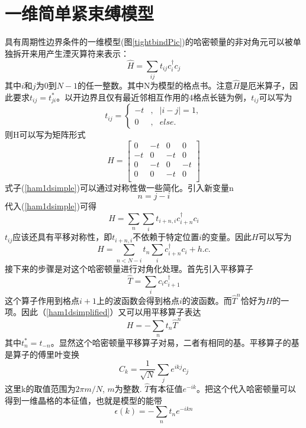 \section{一维简单紧束缚模型}
具有周期性边界条件的一维模型(图\ref{tightbindPic})的哈密顿量的非对角元可以被单独拆开来用产生湮灭算符来表示：
\begin{equation}
  \hat{H} = \sum_{ij} t_{ij} c_{i}^{\dagger} c_j
  \label{ham1dsimple}
\end{equation}
其中$i$和$j$为$0$到$N-1$的任一整数。其中N为模型的格点书。注意$\hat{H}$是厄米算子，因此要求$t_{ij} = t^*_{ji}$。以开边界且仅有最近邻相互作用的4格点长链为例，$t_{ij}$可以写为
\begin{equation}
\label{eq6}
t_{ij}=\left\{
\begin{aligned}
-t & , & |i - j| = 1, \\
0 & , & else.
\end{aligned}
\right.
\end{equation}
则H可以写为矩阵形式
\begin{equation}
H =
\begin{bmatrix} 

    0 & -t & 0 & 0 \\
    -t & 0 & -t & 0 \\
    0 & -t & 0 & -t \\
    0 & 0 & -t & 0 \\
  \end{bmatrix}
 \end{equation}
式子(\ref{ham1dsimple})可以通过对称性做一些简化。引入新变量n
\begin{equation}
  n = j - i
\end{equation}
代入(\ref{ham1dsimple})可得
\begin{equation}
  H = \sum_{n} \sum_i t_{i+n, i} c_{i+n}^\dagger c_i
\end{equation}
$t_{ij}$应该还具有平移对称性，即$t_{i+n, i}$不依赖于特定位置$i$的变量。因此$H$可以写为
\begin{equation}
  H = \sum_{n < N - i} t_n \sum_i c_{i+n}^\dagger c_i + h.c.
  \label{ham1dsimplified}
\end{equation}
接下来的步骤是对这个哈密顿量进行对角化处理。首先引入平移算子
\begin{equation}
  \hat{T} = \sum_i c_i c^\dagger_{i + 1}
\end{equation}
这个算子作用到格点$i + 1$上的波函数会得到格点$i $的波函数。而$\hat{T}^n$恰好为$H$的一项。因此（\ref{ham1dsimplified}）又可以用平移算子表达
\begin{equation}
  H = - \sum_n t_n \hat{T}^n
\end{equation}
其中$t_n^* = t_{-n}$。显然这个哈密顿量平移算子对易，二者有相同的基。平移算子的基是算子的傅里叶变换
\begin{equation}
  C_k = \frac{1}{\sqrt{N}} \sum_j e^{ikj} c_j
\end{equation}
这里k的取值范围为$2 \pi m  / N$, $m$为整数. $\hat{T}$有本征值$e^{-ik}$。把这个代入哈密顿量可以得到一维晶格的本征值，也就是模型的能带
\begin{equation}
\epsilon(k) = - \sum_n t_n e^{-ikn}
\end{equation}

